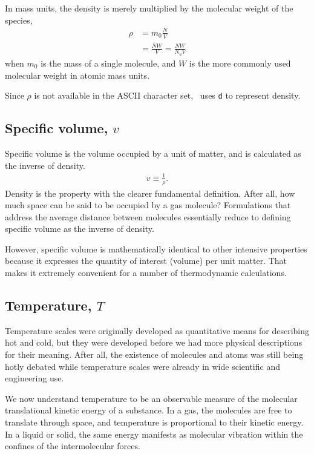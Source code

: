 In mass units, the density is merely multiplied by the molecular weight of the species,
\begin{align}
\rho &= m_0 \frac{N}{V}\\
 &= \frac{\overline{N} W}{V} = \frac{N W}{N_a V}\nonumber
\end{align}
when $m_0$ is the mass of a single molecule, and $W$ is the more commonly used molecular weight in atomic mass units.

Since $\rho$ is not available in the ASCII character set, \PM\ uses \verb|d| to represent density.

\subsection{Specific volume, $v$}

Specific volume is the volume occupied by a unit of matter, and is calculated as the inverse of density.
\begin{align}
v \equiv \frac{1}{\rho}.
\end{align}
Density is the property with the clearer fundamental definition.  After all, how much space can be said to be occupied by a gas molecule?  Formulations that address the average distance between molecules essentially reduce to defining specific volume as the inverse of density.

However, specific volume is mathematically identical to other intensive properties because it expresses the quantity of interest (volume) per unit matter.  That makes it extremely convenient for a number of thermodynamic calculations.

\subsection{Temperature, $T$}

Temperature scales were originally developed as quantitative means for describing hot and cold, but they were developed before we had more physical descriptions for their meaning.  After all, the existence of molecules and atoms was still being hotly debated while temperature scales were already in wide scientific and engineering use.

We now understand temperature to be an observable measure of the molecular translational kinetic energy of a substance.  In a gas, the molecules are free to translate through space, and temperature is proportional to their kinetic energy.  In a liquid or solid, the same energy manifests as molecular vibration within the confines of the intermolecular forces.

